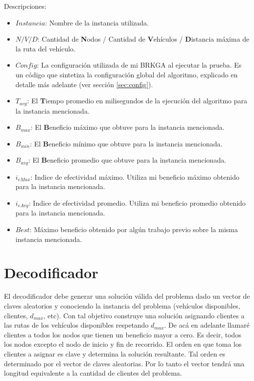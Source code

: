 Descripciones:
\begin{itemize}
	\item \textbf{$Instancia$}: Nombre de la instancia utilizada.
	\item \textbf{$N/V/D$}: Cantidad de \textbf{N}odos / Cantidad de \textbf{V}ehículos / \textbf{D}istancia máxima de la ruta del vehículo.
	\item \textbf{$Config$}: La configuración utilizada de mi BRKGA al ejecutar la prueba. Es un código que sintetiza la configuración global del algoritmo, explicado en detalle más adelante (ver sección \ref{sec:config}).
	\item \textbf{$T_{avg}$}: El \textbf{T}iempo promedio en milisegundos de la ejecución del algoritmo para la instancia mencionada.
	\item \textbf{$B_{max}$}: El \textbf{B}eneficio máximo que obtuve para la instancia mencionada.
	\item \textbf{$B_{min}$}: El \textbf{B}eneficio mínimo que obtuve para la instancia mencionada.
	\item \textbf{$B_{avg}$}: El \textbf{B}eneficio promedio que obtuve para la instancia mencionada.
	\item \textbf{$i_{eMax}$}: Indice de efectividad máximo. Utiliza mi beneficio máximo obtenido para la instancia mencionada.
	\item \textbf{$i_{eAvg}$}: Indice de efectividad promedio. Utiliza mi beneficio promedio obtenido para la instancia mencionada.
	\item \textbf{$Best$}: Máximo beneficio obtenido por algún trabajo previo sobre la misma instancia mencionada.
\end{itemize}

\section{Decodificador}

El decodificador debe generar una solución válida del problema dado un vector de claves aleatorios y conociendo la instancia del problema (vehículos disponibles, clientes, $d_{max}$, etc). Con tal objetivo construye una solución asignando clientes a las rutas de los vehículos disponibles respetando $d_{max}$. De acá en adelante llamaré clientes a todos los nodos que tienen un beneficio mayor a cero. Es decir, todos los nodos excepto el nodo de inicio y fin de recorrido. El orden en que toma los clientes a asignar es clave y determina la solución resultante. Tal orden es determinado por el vector de claves aleatorias. Por lo tanto el vector tendrá una longitud equivalente a la cantidad de clientes del problema.

